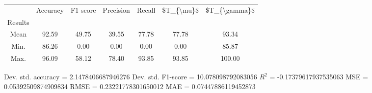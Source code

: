 \begin{tabular}{|c|c|c|c|c|c|c|}
\toprule
{} &  Accuracy &  F1 score &  Precision &  Recall &  \$T\_\{\textbackslash mu\}\$ &  \$T\_\{\textbackslash gamma\}\$ \\
Results &           &           &            &         &            &               \\
\hline
Mean    &     92.59 &     49.75 &      39.55 &   77.78 &      77.78 &         93.34 \\
Min.    &     86.26 &      0.00 &       0.00 &    0.00 &       0.00 &         85.87 \\
Max.    &     96.09 &     58.12 &      78.40 &   93.85 &      93.85 &        100.00 \\
\bottomrule
\end{tabular}

 Dev. std. accuracy = 2.1478406687946276
 Dev. std. F1-score = 10.078098792083056
 $R^2$ = -0.17379617937535063
 MSE = 0.05392509874909834
 RMSE = 0.23221778301650012
 MAE = 0.07447886119452873